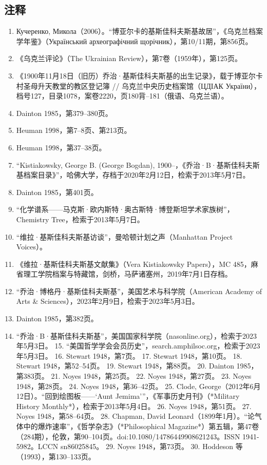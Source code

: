 \subsection{注释}
\begin{enumerate}
\item Кучеренко, Микола（2006）。“博亚尔卡的基斯佳科夫斯基故居”，《乌克兰档案学年鉴》（Український археографічний щорічник），第10/11期，第856页。
\item 《乌克兰评论》（The Ukrainian Review），第7卷（1959年），第125页。
\item 《1900年11月18日（旧历）乔治·基斯佳科夫斯基的出生记录》，载于博亚尔卡村圣母升天教堂的教区登记簿 // 乌克兰中央历史档案馆（ЦДІАК України），档号127，目录1078，案卷2220，页180背–181（俄语、乌克兰语）。
\item Dainton 1985，第379–380页。
\item Heuman 1998，第7–8页、第213页。
\item Heuman 1998，第37–38页。
\item “Kistiakowsky, George B. (George Bogdan), 1900–，《乔治·B·基斯佳科夫斯基档案目录》”，哈佛大学，存档于2020年2月12日，检索于2013年5月7日。
\item Dainton 1985，第401页。
\item “化学谱系——马克斯·欧内斯特·奥古斯特·博登斯坦学术家族树”，Chemistry Tree，检索于2013年5月7日。
\item “维拉·基斯佳科夫斯基访谈”，曼哈顿计划之声（Manhattan Project Voices）。
\item 《维拉·基斯佳科夫斯基文献集》（Vera Kistiakowsky Papers），MC 485，麻省理工学院档案与特藏馆，剑桥，马萨诸塞州，2019年7月1日存档。
\item “乔治·博格丹·基斯佳科夫斯基”，美国艺术与科学院（American Academy of Arts & Sciences），2023年2月9日，检索于2023年5月3日。
\item Dainton 1985，第382页。
\item “乔治·B·基斯佳科夫斯基”，美国国家科学院（nasonline.org），检索于2023年5月3日。
15. “美国哲学学会会员历史”，search.amphilsoc.org，检索于2023年5月3日。
16. Stewart 1948，第7页。
17. Stewart 1948，第10页。
18. Stewart 1948，第52–54页。
19. Stewart 1948，第88页。
20. Dainton 1985，第383页。
21. Noyes 1948，第25页。
22. Noyes 1948，第27页。
23. Noyes 1948，第28页。
24. Noyes 1948，第36–42页。
25. Clode, George（2012年6月12日）。“回到绘图板——‘Aunt Jemima’”，《军事历史月刊》（*Military History Monthly*），检索于2013年5月4日。
26. Noyes 1948，第51页。
27. Noyes 1948，第58–64页。
28. Chapman, David Leonard（1899年1月）。“论气体中的爆炸速率”，《哲学杂志》（*Philosophical Magazine*）第五辑，第47卷（284期），伦敦，第90–104页。doi:10.1080/14786449908621243。ISSN 1941-5982。LCCN sn86025845。
29. Noyes 1948，第73页。
30. Hoddeson 等（1993），第130–133页。

\end{enumerate}